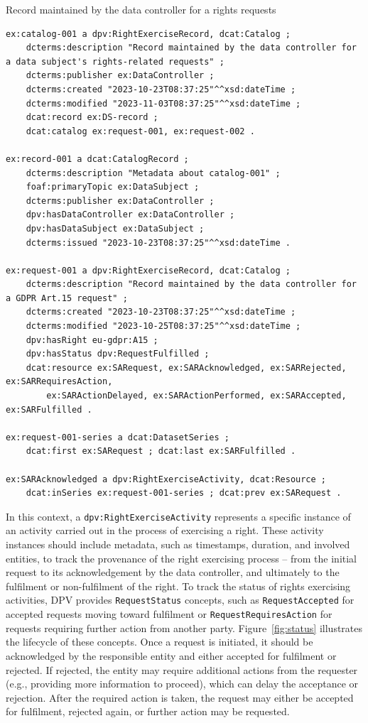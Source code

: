 \documentclass{IOS-Book-Article}     %
\begin{document}
\begin{listing}[ht]
\caption{Record maintained by the data controller for a rights requests}
\label{lst:record}
\begin{verbatim}
ex:catalog-001 a dpv:RightExerciseRecord, dcat:Catalog ;
    dcterms:description "Record maintained by the data controller for a data subject's rights-related requests" ;
    dcterms:publisher ex:DataController ;
    dcterms:created "2023-10-23T08:37:25"^^xsd:dateTime ;
    dcterms:modified "2023-11-03T08:37:25"^^xsd:dateTime ;
    dcat:record ex:DS-record ;
    dcat:catalog ex:request-001, ex:request-002 .

ex:record-001 a dcat:CatalogRecord ;
    dcterms:description "Metadata about catalog-001" ;
    foaf:primaryTopic ex:DataSubject ;
    dcterms:publisher ex:DataController ;
    dpv:hasDataController ex:DataController ;
    dpv:hasDataSubject ex:DataSubject ;
    dcterms:issued "2023-10-23T08:37:25"^^xsd:dateTime .

ex:request-001 a dpv:RightExerciseRecord, dcat:Catalog ;
    dcterms:description "Record maintained by the data controller for a GDPR Art.15 request" ;
    dcterms:created "2023-10-23T08:37:25"^^xsd:dateTime ;
    dcterms:modified "2023-10-25T08:37:25"^^xsd:dateTime ;
    dpv:hasRight eu-gdpr:A15 ;
    dpv:hasStatus dpv:RequestFulfilled ;
    dcat:resource ex:SARequest, ex:SARAcknowledged, ex:SARRejected, ex:SARRequiresAction, 
        ex:SARActionDelayed, ex:SARActionPerformed, ex:SARAccepted, ex:SARFulfilled .

ex:request-001-series a dcat:DatasetSeries ;
    dcat:first ex:SARequest ; dcat:last ex:SARFulfilled .

ex:SARAcknowledged a dpv:RightExerciseActivity, dcat:Resource ;
    dcat:inSeries ex:request-001-series ; dcat:prev ex:SARequest .
\end{verbatim}
\end{listing}

In this context, a \texttt{dpv:RightExerciseActivity} represents a specific instance of an activity carried out in the process of exercising a right.
These activity instances should include metadata, such as timestamps, duration, and involved entities, to track the provenance of the right exercising process -- from the initial request to its acknowledgement by the data controller, and ultimately to the fulfilment or non-fulfilment of the right.
To track the status of rights exercising activities, DPV provides \texttt{RequestStatus} concepts, such as \texttt{RequestAccepted} for accepted requests moving toward fulfilment or \texttt{RequestRequiresAction} for requests requiring further action from another party.
Figure~\ref{fig:status} illustrates the lifecycle of these concepts.
Once a request is initiated, it should be acknowledged by the responsible entity and either accepted for fulfilment or rejected.
If rejected, the entity may require additional actions from the requester (e.g., providing more information to proceed), which can delay the acceptance or rejection.
After the required action is taken, the request may either be accepted for fulfilment, rejected again, or further action may be requested.
\end{document}
